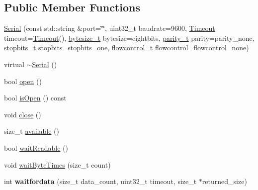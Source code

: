 \subsection*{Public Member Functions}
\begin{DoxyCompactItemize}
\item 
\hyperlink{classserial_1_1_serial_aecbc4cc1723143805ae5a4aa79ba9332}{Serial} (const std\+::string \&port=\char`\"{}\char`\"{}, uint32\+\_\+t baudrate=9600, \hyperlink{structserial_1_1_timeout}{Timeout} timeout=\hyperlink{structserial_1_1_timeout}{Timeout}(), \hyperlink{namespaceserial_a00b3281fa11cea770c0b0c8a106080f8}{bytesize\+\_\+t} bytesize=eightbits, \hyperlink{namespaceserial_a8f45d26bf7c9a06659e75b5004a50481}{parity\+\_\+t} parity=parity\+\_\+none, \hyperlink{namespaceserial_af5b116611d6628a3aa8f788fdc09f469}{stopbits\+\_\+t} stopbits=stopbits\+\_\+one, \hyperlink{namespaceserial_a93ef57a314b4e562f9eded6c15d34351}{flowcontrol\+\_\+t} flowcontrol=flowcontrol\+\_\+none)
\item 
virtual \hyperlink{classserial_1_1_serial_a071000a2f5f77a40df8311fad5044481}{$\sim$\+Serial} ()
\item 
bool \hyperlink{classserial_1_1_serial_aa4403ddb51e9d209fd86ed316f0ee9b4}{open} ()
\item 
bool \hyperlink{classserial_1_1_serial_a48458f741d0fdcc5623b4daa079cbf78}{is\+Open} () const 
\item 
void \hyperlink{classserial_1_1_serial_a501082725b61e4baf615266065bbac5f}{close} ()
\item 
size\+\_\+t \hyperlink{classserial_1_1_serial_ab5fae6cebb8e34345ca1f55cbccc4698}{available} ()
\item 
bool \hyperlink{classserial_1_1_serial_a59bd8d40309769e8eed91dd3684e0000}{wait\+Readable} ()
\item 
void \hyperlink{classserial_1_1_serial_a35c0f6ff20c142a5210dde288731f954}{wait\+Byte\+Times} (size\+\_\+t count)
\item 
int {\bfseries waitfordata} (size\+\_\+t data\+\_\+count, uint32\+\_\+t timeout, size\+\_\+t $\ast$returned\+\_\+size)\hypertarget{classserial_1_1_serial_aa94e4ca3b2b803e3145c99fe063ae09b}{}\label{classserial_1_1_serial_aa94e4ca3b2b803e3145c99fe063ae09b}


\end{DoxyCompactItemize}
